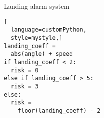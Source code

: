 \begin{marginlisting}
  \caption{Landing alarm system}
  \vspace{\lineheight}
\begin{lstlisting}[
  language=customPython,
  style=mystyle,]
landing_coeff =
  abs(angle) + speed
if landing_coeff < 2:
  risk = 0
else if landing_coeff > 5:
  risk = 3
else:
  risk =
    floor(landing_coeff) - 2
  \end{lstlisting}
\end{marginlisting}
